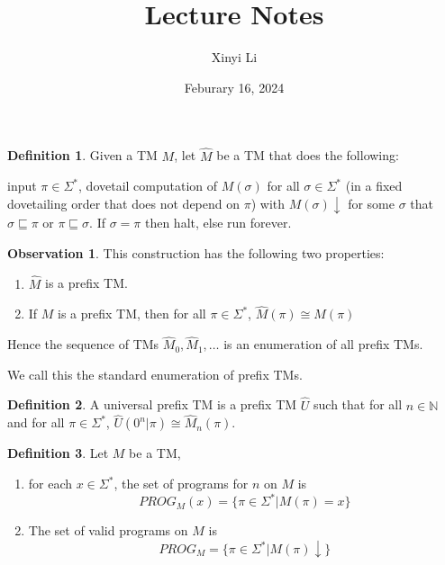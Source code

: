 \documentclass[12pt, margin=1in]{article}
\title{Lecture Notes}
\author{Xinyi Li}
\date{Feburary 16, 2024}
\theoremstyle{definition}
\newtheorem*{definition}{Definition}
\newtheorem*{observation}{Observation}
\begin{document}
\maketitle

\begin{definition}

    Given a TM $M$, let $\hat M$ be a TM that does the following:

    input $\pi \in \Sigma^*$, dovetail computation of $M(\sigma)$ for all $\sigma \in \Sigma^*$ (in a fixed dovetailing order that does not depend on $\pi$) with $M(\sigma) \downarrow$ for some $\sigma$ that $\sigma \sqsubseteq \pi$ or $\pi \sqsubseteq \sigma$. If $\sigma = \pi$ then halt, else run forever.

\end{definition}

\begin{observation}
    This construction has the following two properties:

    \begin{enumerate}
        \item  $\hat M$ is a prefix TM.
        \item If $M$ is a prefix TM, then for all $\pi \in \Sigma^*$, $\hat M(\pi) \cong M(\pi)$
    \end{enumerate}

    Hence the sequence of TMs $\hat M_0, \hat M_1, \ldots$ is an enumeration of all prefix TMs.

    We call this the standard enumeration of prefix TMs.
\end{observation}

\begin{definition}
    A universal prefix TM is a prefix TM $\hat U$ such that for all $n \in \mathbb{N}$ and for all $\pi \in \Sigma^*$, $\hat U(0^n|\pi) \cong \hat M_n(\pi)$.
\end{definition}

\begin{definition}
    Let $M$ be a TM,

    \begin{enumerate}
        \item for each $x \in \Sigma^*$, the set of programs for $n$ on $M$ is $$PROG_M(x) = \{\pi \in \Sigma^* \vert M(\pi) = x\}$$
        \item The set of valid programs on $M$ is $$PROG_M = \{\pi \in \Sigma^* \vert M(\pi) \downarrow\}$$
    \end{enumerate}
\end{definition}
\end{document}
